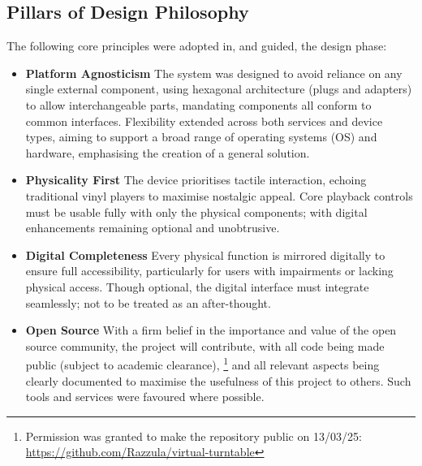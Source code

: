         \subsection{Pillars of Design Philosophy}
    
            The following core principles were adopted in, and guided, the design phase:
    
            \begin{itemize}
                \item \textbf{Platform Agnosticism} The system was designed to avoid reliance on any single external component, using hexagonal architecture (plugs and adapters) to allow interchangeable parts, mandating components all conform to common interfaces. Flexibility extended across both services and device types, aiming to support a broad range of operating systems (OS) and hardware, emphasising the creation of a general solution.
            \end{itemize}
    
            \begin{itemize}
                \item \textbf{Physicality First} The device prioritises tactile interaction, echoing traditional vinyl players to maximise nostalgic appeal. Core playback controls must be usable fully with only the physical components; with digital enhancements remaining optional and unobtrusive.
            \end{itemize}
    
            \begin{itemize}
                \item \textbf{Digital Completeness} Every physical function is mirrored digitally to ensure full accessibility, particularly for users with impairments or lacking physical access. Though optional, the digital interface must integrate seamlessly; not to be treated as an after-thought.
            \end{itemize}
    
            \begin{itemize}
                \item \textbf{Open Source} With a firm belief in the importance and value of the open source community, the project will contribute, with all code being made public (subject to academic clearance), \footnote{Permission was granted to make the repository public on 13/03/25: \url{https://github.com/Razzula/virtual-turntable}} and all relevant aspects being clearly documented to maximise the usefulness of this project to others. Such tools and services were favoured where possible.
            \end{itemize}
    
